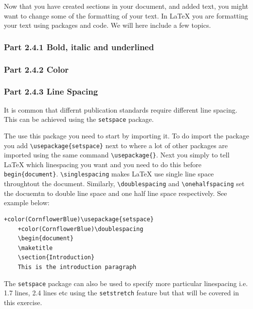 \documentclass[12pts]{report}
\begin{document}
Now that you have created sections in your document, and added text, you might want to change some of the formatting of your text. In {\LaTeX} you are formatting your text using packages and code. We will here include a few topics.

\subsubsection*{Part 2.4.1 Bold, italic and underlined}

\subsubsection*{Part 2.4.2 Color}

\subsubsection*{Part 2.4.3 Line Spacing}
It is common that differnt publication standards require different line spacing. This can be achieved using the \texttt{setspace} package. 

The use this package you need to start by importing it. To do import the package you add \verb|\usepackage{setspace}| next to where a lot of other packages are imported using the same command \verb|\usepackage{}|. Next you simply to tell {\LaTeX} which linespacing you want and you need to do this before \verb|begin{document}|. \verb|\singlespacing| makes {\LaTeX} use single line space throughtout the document. Similarly, \verb|\doublespacing| and \verb|\onehalfspacing| set the docuemtn to double line space and one half line space respectively. See example below:

\begin{Verbatim}[commandchars=+\(\)]
	+color(CornflowerBlue)\usepackage{setspace}
	+color(CornflowerBlue)\doublespacing
	\begin{document}
	\maketitle
	\section{Introduction}
	This is the introduction paragraph
\end{Verbatim}

The \texttt{setspace} package can also be used to specify more particular linespacing i.e. 1.7 lines, 2.4 lines etc using the \texttt{setstretch} feature but that will be covered in this exercise.
\end{document}
